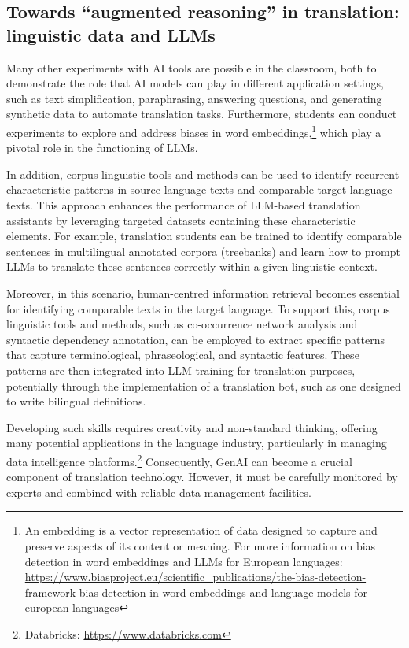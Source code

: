 \documentclass[output=paper]{langscibook}
\begin{document}
\subsection{Towards ``augmented reasoning'' in translation: linguistic data and LLMs}
Many other experiments with AI tools are possible in the classroom, both to demonstrate the role that AI models can play in different application settings, such as text simplification, paraphrasing, answering questions, and generating synthetic data to automate translation tasks. Furthermore, students can conduct experiments to explore and address biases in word embeddings,\footnote{An embedding is a vector representation of data designed to capture and preserve aspects of its content or meaning. For more information on bias detection in word embeddings and LLMs for European languages: \url{https://www.biasproject.eu/scientific\_publications/the-bias-detection-framework-bias-detection-in-word-embeddings-and-language-models-for-european-languages}} which play a pivotal role in the functioning of LLMs.

In addition, corpus linguistic tools and methods can be used to identify recurrent characteristic patterns in source language texts and comparable target language texts. This approach enhances the performance of LLM-based translation assistants by leveraging targeted datasets containing these characteristic elements. For example, translation students can be trained to identify comparable sentences in multilingual annotated corpora (treebanks) and learn how to prompt LLMs to translate these sentences correctly within a given linguistic context.

Moreover, in this scenario, human-centred information retrieval becomes essential for identifying comparable texts in the target language. To support this, corpus linguistic tools and methods, such as co-occurrence network analysis and syntactic dependency annotation, can be employed to extract specific patterns that capture terminological, phraseological, and syntactic features. These patterns are then integrated into LLM training for translation purposes, potentially through the implementation of a translation bot, such as one designed to write bilingual definitions.

Developing such skills requires creativity and non-standard thinking, offering many potential applications in the language industry, particularly in managing data intelligence platforms.\footnote{Databricks: \url{https://www.databricks.com}} Consequently, GenAI can become a crucial component of translation technology. However, it must be carefully monitored by experts and combined with reliable data management facilities.
\end{document}
